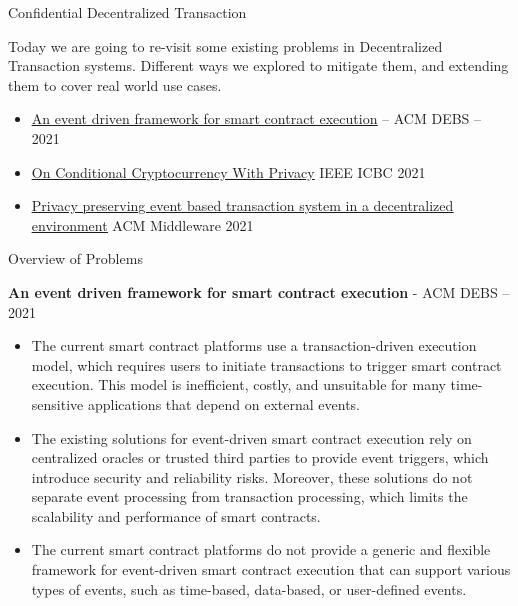 \documentclass[10pt,aspectratio=169]{beamer}
\begin{document}
\begin{frame}{Confidential Decentralized Transaction}{\thesection \, \secname}

Today we are going to re-visit some existing problems in Decentralized Transaction systems. Different ways we explored to mitigate them, and extending them to cover real world use cases.

\begin{itemize}
\item {\href{https://dl.acm.org/doi/abs/10.1145/3465480.3466924}{\underline{An event driven framework for smart contract execution}}}  {} -- {ACM DEBS} -- {2021}
\item {\href{https://ieeexplore.ieee.org/abstract/document/9461133}{\underline{On Conditional Cryptocurrency With Privacy}}} 
    {} 
    {IEEE ICBC} 
    {2021}
\item {\href{https://dl.acm.org/doi/abs/10.1145/3464298.3493401}{\underline{Privacy preserving event based transaction system in a decentralized environment}}} 
    {} 
    {ACM Middleware}
    {2021}
\end{itemize}
\end{frame}

\begin{frame}{Overview of Problems}

\textbf {An event driven framework for smart contract execution} - {ACM DEBS} -- {2021}

\begin{itemize} 
\item The current smart contract platforms use a transaction-driven execution model, which requires users to initiate transactions to trigger smart contract execution. This model is inefficient, costly, and unsuitable for many time-sensitive applications that depend on external events. 
\item The existing solutions for event-driven smart contract execution rely on centralized oracles or trusted third parties to provide event triggers, which introduce security and reliability risks. Moreover, these solutions do not separate event processing from transaction processing, which limits the scalability and performance of smart contracts. 
\item The current smart contract platforms do not provide a generic and flexible framework for event-driven smart contract execution that can support various types of events, such as time-based, data-based, or user-defined events. 
\end{itemize}
\end{frame}
\end{document}
